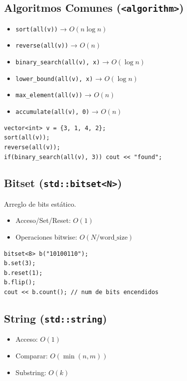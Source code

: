 \documentclass{article}
\begin{document}
\subsection{Algoritmos Comunes (\texttt{<algorithm>})}

\begin{itemize}
  \item \lstinline|sort(all(v))| → \(O(n \log n)\)
  \item \lstinline|reverse(all(v))| → \(O(n)\)
  \item \lstinline|binary_search(all(v), x)| → \(O(\log n)\)
  \item \lstinline|lower_bound(all(v), x)| → \(O(\log n)\)
  \item \lstinline|max_element(all(v))| → \(O(n)\)
  \item \lstinline|accumulate(all(v), 0)| → \(O(n)\)
\end{itemize}

\begin{lstlisting}[style=cppstyle]
vector<int> v = {3, 1, 4, 2};
sort(all(v));
reverse(all(v));
if(binary_search(all(v), 3)) cout << "found";
\end{lstlisting}


\subsection{Bitset (\texttt{std::bitset<N>})}

Arreglo de bits estático.

\begin{itemize}
  \item Acceso/Set/Reset: \(O(1)\)
  \item Operaciones bitwise: \(O(N / \text{word\_size})\)
\end{itemize}

\begin{lstlisting}[style=cppstyle]
bitset<8> b("10100110");
b.set(3);
b.reset(1);
b.flip();
cout << b.count(); // num de bits encendidos
\end{lstlisting}


\subsection{String (\texttt{std::string})}

\begin{itemize}
  \item Acceso: \(O(1)\)
  \item Comparar: \(O(\min(n,m))\)
  \item Substring: \(O(k)\)
\end{itemize}
\end{document}
